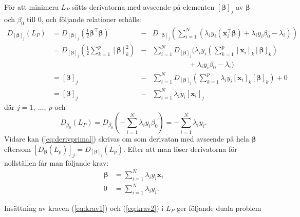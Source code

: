 \documentclass[a4paper, 12pt]{report}
\theoremstyle{definition}
\theoremstyle{remark}
\newcommand{\bfbeta}{{\boldsymbol{\beta}}}
\newcommand{\bfx}{\mathbf{x}}
\begin{document}
För att minimera $L_P$ sätts derivatorna med avseende på elementen $\left[\bfbeta\right]_j$ av $\bfbeta$ och $\beta_0$ till 0, och följande relationer erhålls:
\begin{equation}\label{eq:derivprimal}
\begin{aligned}
	D_{ \left[\bfbeta\right]_j } \left(L_P\right) &= D_{ \left[\bfbeta\right]_j } \left( \frac{1}{2} \bfbeta^\intercal \bfbeta \right) &- &D_{ \left[\bfbeta\right]_j } \left( \sum_{i=1}^{N} \left( \lambda_i y_i \left( \bfx_i^\intercal\bfbeta \right) + \lambda_i y_i \beta_0 - \lambda_i \right)\right)\\
	&= D_{ \left[\bfbeta\right]_j } \left( \frac{1}{2} \sum_{k=1}^{p} \left[\bfbeta\right]_k^2 \right)
	&- &\sum_{i=1}^{N} D_{ \left[\bfbeta\right]_j }
	\Big(  \lambda_i y_i \left( \sum_{k=1}^{p} \left[\mathbf{x}_i\right]_k \left[ \bfbeta \right]_k \right)\\
	& & &\qquad\qquad\quad+ \lambda_i y_i \beta_0-\lambda_i \Big)\\
	&= [\bfbeta]_j &- &\sum_{i=1}^{N} D_{ \left[\bfbeta\right]_j } \left( \sum_{k=1}^{p} \lambda_i y_i \left[\mathbf{x}_i\right]_k\left[\bfbeta\right]_k \right) + 0\\
	&= [\bfbeta]_j &- &\sum_{i=1}^{N}\lambda_i y_i \left[ \mathbf{x}_i \right]_j
\end{aligned}
\end{equation}
där $j=1,~\dots,~p$ och
\begin{equation*}
	D_{\beta_0}\left(L_P\right) = D_{\beta_0}\left( -\sum_{i=1}^{N} \lambda_i y_i \beta_0 \right) = -\sum_{i=1}^{N} \lambda_i y_i.
\end{equation*}
Vidare kan (\ref{eq:derivprimal}) skrivas om som derivatan med avseende på hela $\bfbeta$ eftersom $ \left[ D_{ \bfbeta }\left(L_p\right) \right]_j = D_{\left[ \bfbeta \right]_j}\left(L_p\right) $. Efter att man löser derivatorna för nollställen får man följande krav:
\begin{align}\label{eq:krav1}
	\bfbeta &= \sum_{i=1}^{N} \lambda_i y_i \mathbf{x}_i\\
	0 &= \sum_{i=1}^{N} \lambda_i y_i.\label{eq:krav2}
\end{align}

Insättning av kraven (\ref{eq:krav1}) och (\ref{eq:krav2}) i $L_P$ ger följande duala problem
\end{document}
